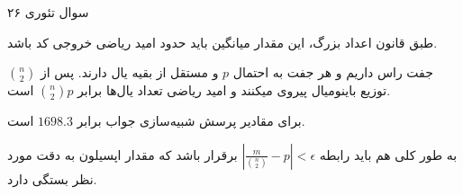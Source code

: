 سوال تئوری ۲۶

طبق قانون اعداد بزرگ، این مقدار میانگین باید حدود امید ریاضی خروجی کد باشد.

$\binom{n}{2}$
جفت راس داریم و هر جفت به احتمال 
$p$
و مستقل از بقیه یال دارند.
پس از توزیع باینومیال پیروی میکنند و امید ریاضی تعداد یال‌ها برابر
$\binom{n}{2}p$
است.

برای مقادیر پرسش شبیه‌سازی جواب برابر
$1698.3$
است.

به طور کلی هم باید رابطه 
$|\frac{m}{\binom{n}{2}}-p| < \epsilon$
برقرار باشد که مقدار اپسیلون به دقت مورد نظر بستگی دارد.